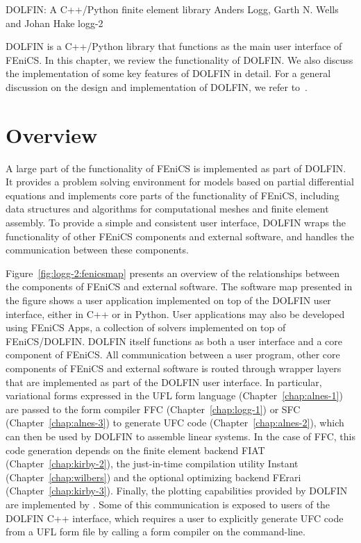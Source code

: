               {DOLFIN: A C++/Python finite element library}
              {Anders Logg, Garth N. Wells and Johan Hake}
              {logg-2}

DOLFIN is a C++/Python library that functions as the main user
interface of FEniCS. In this chapter, we review the functionality of
DOLFIN. We also discuss the implementation of some key features of
DOLFIN in detail. For a general discussion on the design and
implementation of DOLFIN, we refer to~\citet{LoggWells2010}.

\section{Overview}

A large part of the functionality of FEniCS is implemented as part of
DOLFIN. It provides a problem solving environment for models based
on partial differential equations and implements core parts of the
functionality of FEniCS, including data structures and algorithms for
computational meshes and finite element assembly. To provide a simple
and consistent user interface, DOLFIN wraps the functionality of other
FEniCS components and external software, and handles the communication
between these components.

Figure~\ref{fig:logg-2:fenicsmap} presents an overview of
the relationships between the components of FEniCS and external
software. The software map presented in the figure shows a
user application implemented on top of the DOLFIN user interface,
either in C++ or in Python. User applications may also be developed
using FEniCS Apps, a collection of solvers implemented on top of
FEniCS/DOLFIN. DOLFIN itself functions as both a user interface and a
core component of FEniCS. All communication between a user program,
other core components of FEniCS and external software is routed
through wrapper layers that are implemented as part of the DOLFIN user
interface. In particular, variational forms expressed in the UFL form
language (Chapter~\ref{chap:alnes-1}) are passed to the form compiler
FFC (Chapter~\ref{chap:logg-1}) or SFC (Chapter~\ref{chap:alnes-3})
to generate UFC code (Chapter~\ref{chap:alnes-2}), which can then
be used by DOLFIN to assemble linear systems. In the case of FFC,
this code generation depends on the finite element backend FIAT
(Chapter~\ref{chap:kirby-2}), the just-in-time compilation utility Instant
(Chapter~\ref{chap:wilbers}) and the optional optimizing backend FErari
(Chapter~\ref{chap:kirby-3}). Finally, the plotting capabilities provided
by DOLFIN are implemented by \citet{www:viper}. Some of this communication
is exposed to users of the DOLFIN C++ interface, which requires a user
to explicitly generate UFC code from a UFL form file by calling a form
compiler on the command-line.

